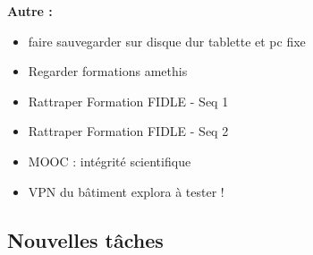 \textbf{Autre :}
\begin{itemize}[label=$\square$] 
	\item[\previous{4}] faire sauvegarder sur disque dur tablette et pc fixe
	\item[\previous{6}] Regarder formations amethis
	\item[\previous{7}] Rattraper Formation FIDLE - Seq 1
	\item[\previous{8}] Rattraper Formation FIDLE - Seq 2
	\item[\previous{8}] MOOC : intégrité scientifique
	\item[\previous{8}] VPN du bâtiment explora à tester !
\end{itemize}

\newpage

\subsection*{Nouvelles tâches}

